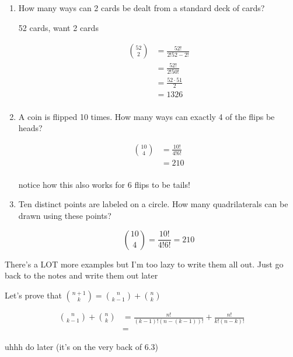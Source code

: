 \documentclass[../../Main.tex]{subfiles}
\begin{document}
\begin{example}

    \begin{enumerate}
        \item
        {
            How many ways can 2 cards be dealt from a standard deck of cards?

            \begin{center}
                52 cards, want 2 cards
            \end{center}

            \begin{align*}
                {52 \choose 2} &= \frac{52!}{2!{52 - 2}!} \\
                &= \frac{52!}{2! 50!} \\
                &= \frac{52 \cdot 51}{2} \\
                &= \boxed{1326} \\
            \end{align*}
        }

        \item
        {
            A coin is flipped 10 times. How many ways can exactly 4 of the flips be heads?

            \begin{align*}
                {10 \choose 4} &= \frac{10!}{4!6!} \\
                &= \boxed{210} \\
            \end{align*}

            notice how this also works for 6 flips to be tails!
        }

        \item
        {
            Ten distinct points are labeled on a circle. How many quadrilaterals can be drawn using these points?

            $${10 \choose 4} = \frac{10!}{4!6!} = \boxed{210}$$
        }
    \end{enumerate}

    There's a LOT more examples but I'm too lazy to write them all out. Just go back to the notes and write them out later

\end{example}

Let's prove that ${n + 1 \choose k} = {n \choose k - 1} + {n \choose k}$

\begin{poof}
    \begin{align*}
        {n \choose k - 1} + {n \choose k} &= \frac{n!}{(k - 1)!(n - (k - 1))!} + \frac{n!}{k!(n - k)!} \\
        &= 
    \end{align*}

    uhhh do later (it's on the very back of 6.3)
\end{poof}

\end{document}
